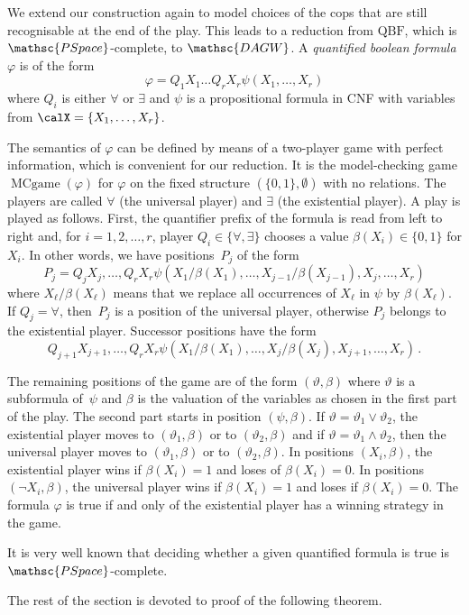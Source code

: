 \documentclass[authoryear]{article}
\theoremstyle{definition}
\renewcommand{\phi}{\varphi}
\renewcommand{\theta}{\vartheta}
\newcommand{\0}{\emptyset}
\newcommand{\pspace}{\ensuremath{\mathsc{PSpace}}\xspace}
\newcommand{\DAGWprob}{\ensuremath{\mathsc{DAGW}}\xspace}
\newcommand{\QBF}{\ensuremath{\mathrm{QBF}}\xspace}
\DeclareMathOperator{\MCGAME}{MCgame}
\begin{document}
We extend our construction again to model choices of the cops that are still
recognisable at the end of the play. This leads to a reduction from \QBF, which
is \pspace-complete, to \DAGWprob. A \emph{quantified boolean formula} $\phi$ is
of the form \[\phi = Q_1X_1\ldots Q_rX_r \psi(X_1,\ldots,X_r)\] where $Q_i$ is
either $\forall$ or $\exists$ and $\psi$ is a propositional formula in CNF with
variables from $\calX =\{X_1,\ldots, X_r\}$.

The semantics of $\phi$ can be defined by means of a two-player game
with perfect information, which is convenient for our reduction. It is
the model-checking game $\MCGAME(\phi)$ for $\phi$ on the fixed structure
$(\{0,1\},\0)$ with no relations. The
players are called $\forall$ (the universal player) and $\exists$ (the
existential player). A play is played as follows. First, the
quantifier prefix of the formula is read from left to right and, for
$i=1,2,\ldots,r$, player $Q_i\in\{\forall, \exists\}$ chooses a value
$\beta(X_i) \in\{0,1\}$ for $X_i$. In other words, we have
positions~$P_j$ of the form
\[P_j = Q_jX_j,\ldots,Q_rX_r
\psi(X_1/\beta(X_1),\ldots,X_{j-1}/\beta(X_{j-1}),X_j,\ldots,X_r)\]
where $X_\ell/\beta(X_\ell)$ means that we replace all occurrences of
$X_\ell$ in $\psi$ by $\beta(X_\ell)$. If $Q_j = \forall$, then~$P_j$
is a position of the universal player, otherwise $P_j$ belongs to the
existential player. Successor positions have the form 
\[Q_{j+1}X_{j+1},\ldots,Q_rX_r
\psi(X_1/\beta(X_1),\ldots,X_j/\beta(X_j),X_{j+1},\ldots,X_r)\,.\]

The remaining positions of the game are of the form $(\theta,\beta)$
where $\theta$ is a subformula of~$\psi$ and $\beta$ is the valuation
of the variables as chosen in the first part of the play. The second part
starts in position $(\psi,\beta)$.  If $\theta = \theta_1 \lor \theta_2$,
the existential player moves to $(\theta_1,\beta)$ or to $(\theta_2,\beta)$
and if $\theta = \theta_1 \land \theta_2$, then the universal player moves
to $(\theta_1,\beta)$ or to $(\theta_2,\beta)$. In positions
$(X_i,\beta)$, the existential player wins if $\beta(X_i) = 1$ and
loses of $\beta(X_i) = 0$. In positions $(\neg X_i,\beta)$, the
universal player wins if $\beta(X_i) = 1$ and loses if $\beta(X_i) =
0$. The formula $\phi$ is true if and only of the existential player has a
winning strategy in the game.

It is very well known that deciding whether a given quantified formula
is true is \pspace-complete. 

The rest of the section is devoted to proof of the following theorem.
\end{document}
